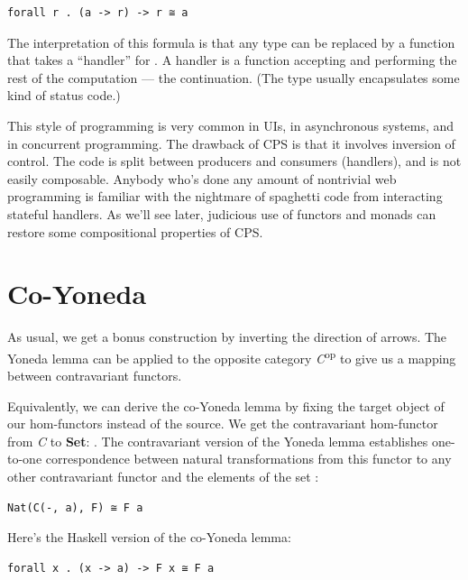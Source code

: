 \begin{Verbatim}[commandchars=\\\{\}]
forall r . (a -> r) -> r ≅ a
\end{Verbatim}

The interpretation of this formula is that any type  can be
replaced by a function that takes a ``handler'' for . A
handler is a function accepting  and performing the rest of
the computation --- the continuation. (The type  usually
encapsulates some kind of status code.)

This style of programming is very common in UIs, in asynchronous
systems, and in concurrent programming. The drawback of CPS is that it
involves inversion of control. The code is split between producers and
consumers (handlers), and is not easily composable. Anybody who's done
any amount of nontrivial web programming is familiar with the nightmare
of spaghetti code from interacting stateful handlers. As we'll see
later, judicious use of functors and monads can restore some
compositional properties of CPS.

\section{Co-Yoneda}\label{co-yoneda}

As usual, we get a bonus construction by inverting the direction of
arrows. The Yoneda lemma can be applied to the opposite category
\emph{C}\textsuperscript{op} to give us a mapping between contravariant
functors.

Equivalently, we can derive the co-Yoneda lemma by fixing the target
object of our hom-functors instead of the source. We get the
contravariant hom-functor from \emph{C} to \textbf{Set}:
. The contravariant version of the Yoneda lemma
establishes one-to-one correspondence between natural transformations
from this functor to any other contravariant functor  and the
elements of the set :

\begin{Verbatim}[commandchars=\\\{\}]
Nat(C(-, a), F) ≅ F a
\end{Verbatim}

Here's the Haskell version of the co-Yoneda lemma:

\begin{Verbatim}[commandchars=\\\{\}]
forall x . (x -> a) -> F x ≅ F a
\end{Verbatim}

